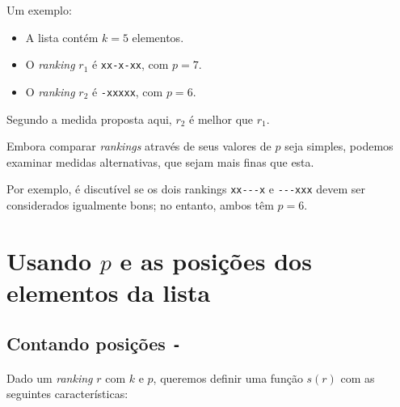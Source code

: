 \documentclass[
  letterpaper,
  DIV=11,
  numbers=noendperiod]{scrreprt}
\begin{document}
Um exemplo:

\begin{itemize}
\item
  A lista contém $k = 5$ elementos.
\item
  O \emph{ranking} $r_1$ é \texttt{xx-x-xx}, com $p = 7$.
\item
  O \emph{ranking} $r_2$ é \texttt{-xxxxx}, com $p = 6$.
\end{itemize}

Segundo a medida proposta aqui, $r_2$ é melhor que $r_1$.

Embora comparar \emph{rankings} através de seus valores de $p$ seja
simples, podemos examinar medidas alternativas, que sejam mais finas que
esta.

Por exemplo, é discutível se os dois rankings \texttt{xx-\/-\/-x} e
\texttt{-\/-\/-xxx} devem ser considerados igualmente bons; no entanto,
ambos têm $p = 6$.

\section{\texorpdfstring{Usando $p$ e as posições dos elementos da
lista}{Usando  e as posições dos elementos da lista}}\label{usando-p-e-as-posiuxe7uxf5es-dos-elementos-da-lista}

\subsection{\texorpdfstring{Contando posições
\texttt{-}}{Contando posições -}}\label{contando-posiuxe7uxf5es--}

Dado um \emph{ranking} $r$ com $k$ e $p$, queremos definir uma função
$s(r)$ com as seguintes características:
\end{document}
